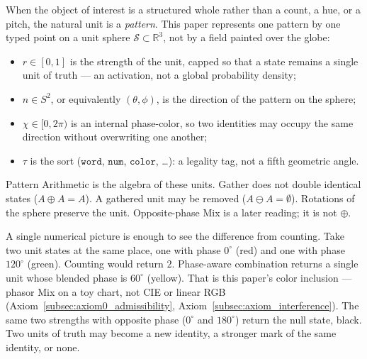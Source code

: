 \documentclass[12pt, a4paper]{article}
\begin{document}
When the object of interest is a structured whole rather than a
count, a hue, or a pitch, the natural unit is a \emph{pattern}.
This paper represents one pattern by one typed point on a unit
sphere $\mathcal{S} \subset \mathbb{R}^3$, not by a field painted over the globe:
\begin{itemize}
    \item $r \in [0, 1]$ is the strength of the unit, capped so that a state remains a single unit of truth --- an activation, not a global probability density;
    \item $\hat n \in S^2$, or equivalently $(\theta, \phi)$, is the direction of the pattern on the sphere;
    \item $\chi \in [0, 2\pi)$ is an internal phase-color, so two identities may occupy the same direction without overwriting one another;
    \item $\tau$ is the sort ($\mathtt{word}$, $\mathtt{num}$, $\mathtt{color}$, \ldots): a legality tag, not a fifth geometric angle.
\end{itemize}
Pattern Arithmetic is the algebra of these units. Gather does not double identical states ($A \oplus A = A$). A gathered unit may be removed ($A \ominus A = \emptyset$). Rotations of the sphere preserve the unit. Opposite-phase Mix is a later reading; it is not $\oplus$.

A single numerical picture is enough to see the difference from counting. Take two unit states at the same place, one with phase $0^\circ$ (red) and one with phase $120^\circ$ (green). Counting would return $2$. Phase-aware combination returns a single unit whose blended phase is $60^\circ$ (yellow). That is this paper's color inclusion --- phasor Mix on a toy chart, not CIE or linear RGB (Axiom~\ref{subsec:axiom0_admissibility}, Axiom~\ref{subsec:axiom_interference}). The same two strengths with opposite phase ($0^\circ$ and $180^\circ$) return the null state, black. Two units of truth may become a new identity, a stronger mark of the same identity, or none.
\end{document}
